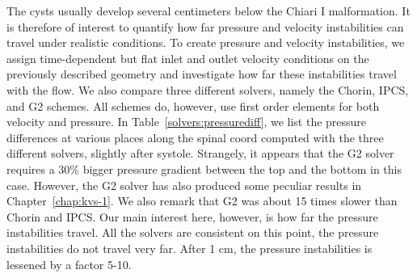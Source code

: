 %
%
%
%
%


The cysts usually develop several centimeters below the Chiari I malformation. It is therefore
of interest to quantify how far pressure and velocity instabilities can travel under realistic conditions. 
To create pressure and velocity instabilities, we assign  time-dependent but flat inlet and outlet 
velocity conditions on the previously described geometry and investigate how far these instabilities
travel with the flow. We also compare three different solvers, namely the Chorin, IPCS, and G2 schemes. 
All schemes do, however, use first order elements for both velocity and pressure. In Table~\ref{solvers:pressurediff}, we list the pressure differences at various places along the spinal coord computed with 
the three different solvers, slightly after systole. Strangely, it appears that the G2 solver requires a 30\% bigger
pressure gradient between the top and the bottom in this case. However, the 
G2 solver has also produced some peculiar results in Chapter~\ref{chap:kvs-1}. We also remark that
G2 was about 15 times slower than Chorin and IPCS. Our main interest here, however,  is how
far the pressure instabilities travel. All the solvers are consistent on this point, the pressure
instabilities do not travel very far. After 1 cm, the pressure instabilities is lessened by a factor 5-10.    


